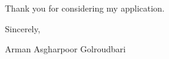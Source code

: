 \documentclass[a4,20pt]{article}
\begin{document}
\begin{large}
\vspace{0.15cm}
Thank you for considering my application.\vspace{-0.1cm}

Sincerely, \vspace{-0.1cm}

Arman Asgharpoor Golroudbari


\end{large}
\end{document}
